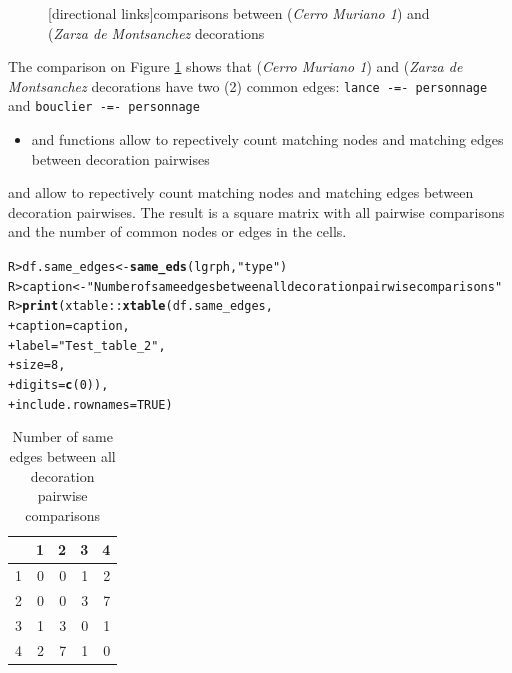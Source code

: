 \documentclass[article]{jss}\usepackage[]{graphicx}\usepackage[]{color}
\makeatletter
\newcommand{\hlnum}[1]{\textcolor[rgb]{0.686,0.059,0.569}{#1}}%
\newcommand{\hlstr}[1]{\textcolor[rgb]{0.192,0.494,0.8}{#1}}%
\newcommand{\hlopt}[1]{\textcolor[rgb]{0,0,0}{#1}}%
\newcommand{\hlstd}[1]{\textcolor[rgb]{0.345,0.345,0.345}{#1}}%
\newcommand{\hlkwb}[1]{\textcolor[rgb]{0.69,0.353,0.396}{#1}}%
\newcommand{\hlkwc}[1]{\textcolor[rgb]{0.333,0.667,0.333}{#1}}%
\newcommand{\hlkwd}[1]{\textcolor[rgb]{0.737,0.353,0.396}{\textbf{#1}}}%
\newenvironment{kframe}{%
 \def\at@end@of@kframe{}%
 \ifinner\ifhmode%
  \def\at@end@of@kframe{\end{minipage}}%
  \begin{minipage}{\columnwidth}%
 \fi\fi%
 \def\FrameCommand##1{\hskip\@totalleftmargin \hskip-\fboxsep
 \colorbox{shadecolor}{##1}\hskip-\fboxsep
     \hskip-\linewidth \hskip-\@totalleftmargin \hskip\columnwidth}%
 \MakeFramed {\advance\hsize-\width
   \@totalleftmargin\z@ \linewidth\hsize
   \@setminipage}}%
 {\par\unskip\endMakeFramed%
 \at@end@of@kframe}
\newenvironment{knitrout}{}{} %
\makeatother
\begin{document}
\begin{figure}[H]
\begin{knitrout}
\end{knitrout}
[directional links]{comparisons between  (\emph{Cerro Muriano 1}) and  (\emph{Zarza de Montsanchez} decorations}
\label{edg_comp}
\end{figure}

The comparison on Figure \ref{edg_comp} shows that  (\emph{Cerro Muriano 1}) and  (\emph{Zarza de Montsanchez} decorations have two (2) common edges: \texttt{lance -=- personnage} and \texttt{bouclier -=- personnage}


\begin{itemize}
  \item {} and  functions allow to repectively count matching nodes and matching edges between decoration pairwises
\end{itemize}

 and  allow to repectively count matching nodes and matching edges between decoration pairwises. The result is a square matrix with all pairwise comparisons and the number of common nodes or edges in the cells.

\begin{kframe}
\begin{alltt}
\hlstd{R> }\hlstd{df.same_edges} \hlkwb{<-} \hlkwd{same_eds}\hlstd{(lgrph,}\hlstr{"type"}\hlstd{)}
\hlstd{R> }\hlstd{caption} \hlkwb{<-} \hlstr{"Number of same edges between all decoration pairwise comparisons"}
\hlstd{R> }\hlkwd{print}\hlstd{(xtable}\hlopt{::}\hlkwd{xtable}\hlstd{(df.same_edges,}
\hlstd{+ }                     \hlkwc{caption}\hlstd{=caption,}
\hlstd{+ }                     \hlkwc{label}\hlstd{=}\hlstr{"Test_table_2"}\hlstd{,}
\hlstd{+ }                     \hlkwc{size}\hlstd{=}\hlnum{8}\hlstd{,}
\hlstd{+ }                     \hlkwc{digits}\hlstd{=}\hlkwd{c}\hlstd{(}\hlnum{0}\hlstd{)),}
\hlstd{+ }      \hlkwc{include.rownames}\hlstd{=}\hlnum{TRUE}\hlstd{)}
\end{alltt}
\end{kframe}%
\begin{table}[ht]
\centering
\begin{tabular}{rrrrr}
  \hline
 & 1 & 2 & 3 & 4 \\ 
  \hline
1 & 0 & 0 & 1 & 2 \\ 
  2 & 0 & 0 & 3 & 7 \\ 
  3 & 1 & 3 & 0 & 1 \\ 
  4 & 2 & 7 & 1 & 0 \\ 
   \hline
\end{tabular}
\caption{Number of same edges between all decoration pairwise comparisons} 
\label{Test_table_2}
\end{table}
\end{document}
